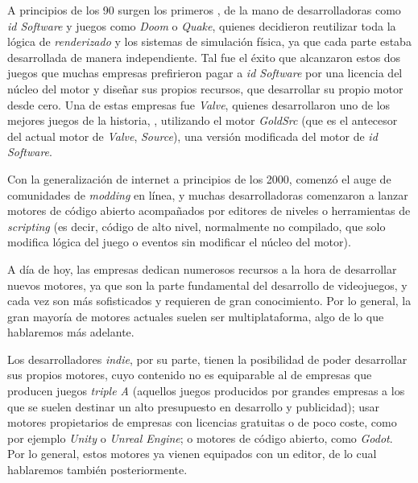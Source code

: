 \smallskip

A principios de los 90 surgen los primeros , de la mano de desarrolladoras como \textit{id Software} y juegos como \textit{Doom} o \textit{Quake}, quienes decidieron reutilizar toda la lógica de \textit{renderizado} y los sistemas de simulación física, ya que cada parte estaba desarrollada de manera independiente. Tal fue el éxito que alcanzaron estos dos juegos que muchas empresas prefirieron pagar a \textit{id Software} por una licencia del núcleo del motor y diseñar sus propios recursos, que desarrollar su propio motor desde cero. Una de estas empresas fue \textit{Valve}, quienes desarrollaron uno de los mejores juegos de la historia, , utilizando el motor \textit{GoldSrc} (que es el antecesor del actual motor de \textit{Valve}, \textit{Source}), una versión modificada del motor de \textit{id Software}.

\medskip

Con la generalización de internet a principios de los 2000, comenzó el auge de comunidades de \textit{modding} en línea, y muchas desarrolladoras comenzaron a lanzar motores de código abierto acompañados por editores de niveles o herramientas de \textit{scripting} (es decir, código de alto nivel, normalmente no compilado, que solo modifica lógica del juego o eventos sin modificar el núcleo del motor).

\smallskip

A día de hoy, las empresas dedican numerosos recursos a la hora de desarrollar nuevos motores, ya que son la parte fundamental del desarrollo de videojuegos, y cada vez son más sofisticados y requieren de gran conocimiento. Por lo general, la gran mayoría de motores actuales suelen ser multiplataforma, algo de lo que hablaremos más adelante.

\smallskip

Los desarrolladores \textit{indie}, por su parte, tienen la posibilidad de poder desarrollar sus propios motores, cuyo contenido no es equiparable al de empresas que producen juegos \textit{triple A} (aquellos juegos producidos por grandes empresas a los que se suelen destinar un alto presupuesto en desarrollo y publicidad); usar motores propietarios de empresas con licencias gratuitas o de poco coste, como por ejemplo \textit{Unity} o \textit{Unreal Engine}; o motores de código abierto, como \textit{Godot}. Por lo general, estos motores ya vienen equipados con un editor, de lo cual hablaremos también posteriormente.

